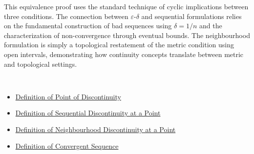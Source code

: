 \begin{remark*}
This equivalence proof uses the standard technique of cyclic implications between three conditions. The connection between $\varepsilon$-$\delta$ and sequential formulations relies on the fundamental construction of bad sequences using $\delta=1/n$ and the characterization of non-convergence through eventual bounds. The neighbourhood formulation is simply a topological restatement of the metric condition using open intervals, demonstrating how continuity concepts translate between metric and topological settings.
\end{remark*}

\begin{remark*}[Dependencies]~\\
\begin{itemize}
  \item \hyperref[def:point-of-discontinuity]{Definition of Point of Discontinuity}
  \item \hyperref[def:sequential-discontinuity-at-a-point]{Definition of Sequential Discontinuity at a Point}
  \item \hyperref[def:neighborhood-discontinuity-at-a-point]{Definition of Neighbourhood Discontinuity at a Point}
  \item \hyperref[def:convergent-sequence]{Definition of Convergent Sequence}
\end{itemize}
\end{remark*}

\clearpage
